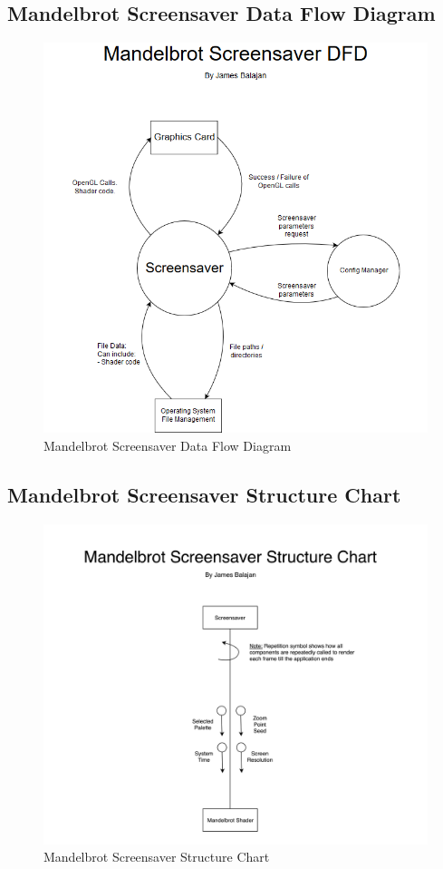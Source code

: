 \documentclass[10pt, openany]{book}
\begin{document}
\subsection{Mandelbrot Screensaver Data Flow Diagram}
\begin{figure}[H]
	\centering
	\includegraphics[width=1.0\linewidth]{Mandelbrot Screensaver DFD}
	\caption{Mandelbrot Screensaver Data Flow Diagram}
	\label{app:mandelbrot-dfd}
\end{figure}
\newpage

\subsection{Mandelbrot Screensaver Structure Chart}
\begin{figure}[H]
	\centering
	\includegraphics[width=1.0\linewidth]{Mandelbrot Screensaver Structure Chart}
	\caption{Mandelbrot Screensaver Structure Chart}
	\label{app:mandelbrot-struc}
\end{figure}
\newpage
\end{document}
